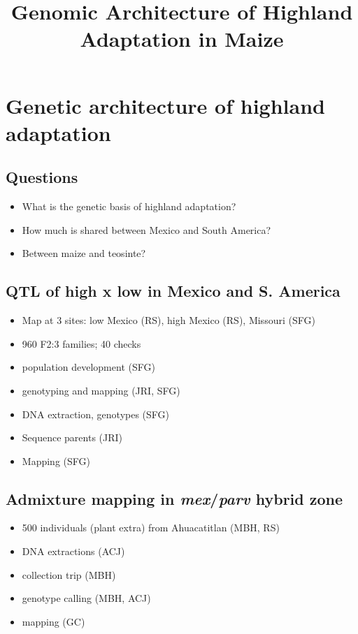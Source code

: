 \documentclass[]{article}
\begin{document}
\title{Genomic Architecture of Highland Adaptation in Maize}

\maketitle

\section{Genetic architecture of highland adaptation}

\subsection{Questions}
	\begin{itemize}	
		\item What is the genetic basis of highland adaptation?  
		\item How much is shared between Mexico and South America? 
		\item Between maize and teosinte? 
	\end{itemize}


\subsection{ QTL of high x low in Mexico and S. America }
		\begin{itemize}
			\item Map at 3 sites: low Mexico (RS), high Mexico (RS), Missouri (SFG)
			\item 960 F2:3 families; 40 checks
			\item population development (SFG)
			\item genotyping and mapping (JRI, SFG)
			\item DNA extraction, genotypes (SFG)
			\item Sequence parents (JRI)
			\item Mapping (SFG)
		\end{itemize}	
		
\subsection{ Admixture mapping in \emph{mex}/\emph{parv} hybrid zone  }
		\begin{itemize}
			\item 500 individuals (plant extra) from Ahuacatitlan (MBH, RS)
			\item DNA extractions (ACJ)
			\item collection trip (MBH)
			\item genotype calling (MBH, ACJ)
			\item mapping (GC)
		\end{itemize}
\end{document}
